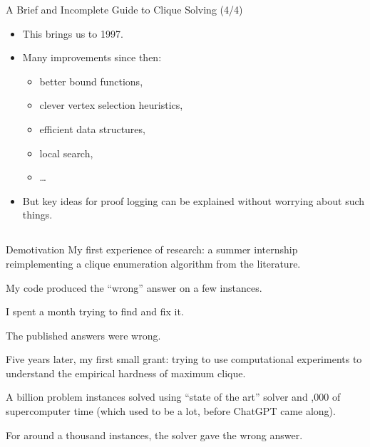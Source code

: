 \documentclass[aspectratio=169,compress,10pt]{beamer}
\begin{document}
\begin{frame}{A Brief and Incomplete Guide to Clique Solving (4/4)}
  \begin{itemize}
  \item
    This brings us to 1997.
    \medskip
  \item
    Many improvements since then:
    \begin{itemize}
    \item
      better bound functions,
    \item
      clever vertex selection heuristics,
    \item
    efficient data structures,
    \item
    local search,
    \item
      \ldots
    \end{itemize}
    \medskip
  \item
    But key ideas for proof logging can be explained without worrying about such things.
  \end{itemize}
\end{frame}

\subsection{}

\begin{frame}{Demotivation}
    My first experience of research: a summer internship reimplementing a clique enumeration
    algorithm from the literature.

    \medskip

    My code produced the ``wrong'' answer on a few instances.

    \medskip\pause

    I spent a month trying to find and fix it.

    \medskip\pause

    The published answers were wrong.

    \medskip\pause

    Five years later, my first small grant: trying to use computational experiments to understand the
    empirical hardness of maximum clique.

    \medskip\pause

    A billion problem instances solved using ``state of the art'' solver and ,000 of
    supercomputer time (which used to be a lot, before ChatGPT came along).

    \medskip\pause

    For around a thousand instances, the solver gave the wrong answer.
\end{frame}
\end{document}
